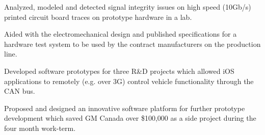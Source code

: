 \label{sub:coop}
{
\begin{tightitemize}
	\item Analyzed, modeled and detected signal integrity issues on high speed (10Gb/s) printed circuit board traces on prototype hardware in a lab.
	\item Aided with the electromechanical design and published specifications for a hardware test system to be used by the contract manufacturers on the production line.
\end{tightitemize}
}

{
\begin{tightitemize}
	\item Developed software prototypes for three R\&D projects which allowed iOS applications to remotely (e.g. over 3G) control vehicle functionality through the CAN bus.
	\item Proposed and designed an innovative software platform for further prototype development which saved GM Canada over \$100,000 as a side project during the four month work-term.
\end{tightitemize}
}
